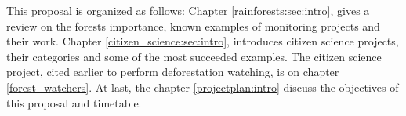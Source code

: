 This proposal is organized as follows: Chapter \ref{rainforests:sec:intro}, gives a review on the forests importance, known examples of monitoring projects and their work. Chapter \ref{citizen_science:sec:intro}, introduces citizen science projects, their categories and some of the most succeeded examples. The citizen science project, cited earlier to perform deforestation watching, is on chapter \ref{forest_watchers}. At last, the chapter \ref{projectplan:intro} discuss the objectives of this proposal and timetable.



